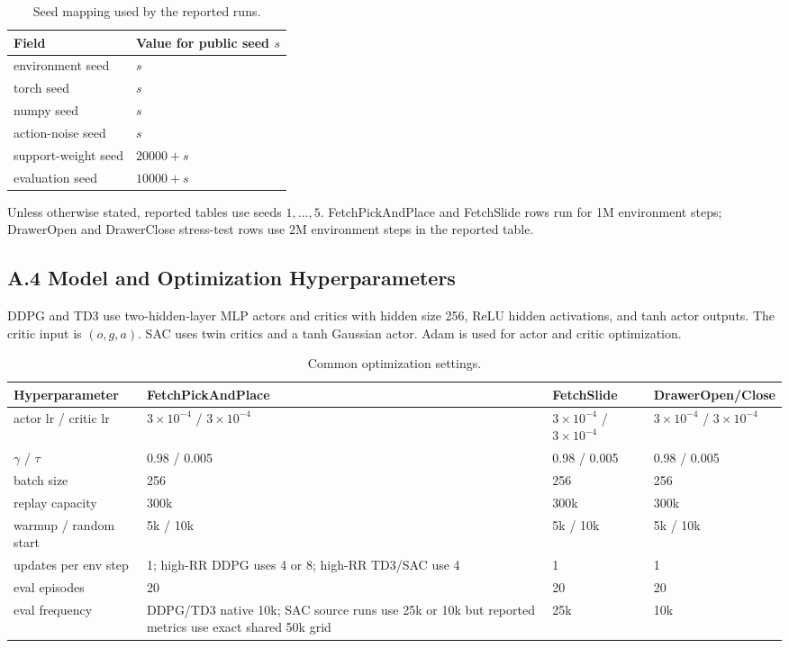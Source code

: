 \documentclass[letterpaper]{article}
\begin{document}
\begin{table}[h]
\centering
\caption{Seed mapping used by the reported runs.}
\label{tab:appendix-seeds}
\begin{tabular}{ll}
\toprule
Field & Value for public seed \(s\) \\
\midrule
environment seed & \(s\) \\
torch seed & \(s\) \\
numpy seed & \(s\) \\
action-noise seed & \(s\) \\
support-weight seed & \(20000+s\) \\
evaluation seed & \(10000+s\) \\
\bottomrule
\end{tabular}
\end{table}

Unless otherwise stated, reported tables use seeds \(1,\ldots,5\). FetchPickAndPlace and FetchSlide rows run for 1M environment steps; DrawerOpen and DrawerClose stress-test rows use 2M environment steps in the reported table.

\subsection{A.4 Model and Optimization Hyperparameters}

DDPG and TD3 use two-hidden-layer MLP actors and critics with hidden size 256, ReLU hidden activations, and tanh actor outputs. The critic input is \((o,g,a)\). SAC uses twin critics and a tanh Gaussian actor. Adam is used for actor and critic optimization.

\begin{table}[h]
\centering
\scriptsize
\caption{Common optimization settings.}
\label{tab:appendix-optim}
\begin{tabular}{@{}p{}p{}p{}p{}@{}}
\toprule
Hyperparameter & FetchPickAndPlace & FetchSlide & DrawerOpen/Close \\
\midrule
actor lr / critic lr & \(3\times10^{-4}\) / \(3\times10^{-4}\) & \(3\times10^{-4}\) / \(3\times10^{-4}\) & \(3\times10^{-4}\) / \(3\times10^{-4}\) \\
\(\gamma\) / \(\tau\) & 0.98 / 0.005 & 0.98 / 0.005 & 0.98 / 0.005 \\
batch size & 256 & 256 & 256 \\
replay capacity & 300k & 300k & 300k \\
warmup / random start & 5k / 10k & 5k / 10k & 5k / 10k \\
updates per env step & 1; high-RR DDPG uses 4 or 8; high-RR TD3/SAC use 4 & 1 & 1 \\
eval episodes & 20 & 20 & 20 \\
eval frequency & DDPG/TD3 native 10k; SAC source runs use 25k or 10k but reported metrics use exact shared 50k grid & 25k & 10k \\
\bottomrule
\end{tabular}
\end{table}
\end{document}
